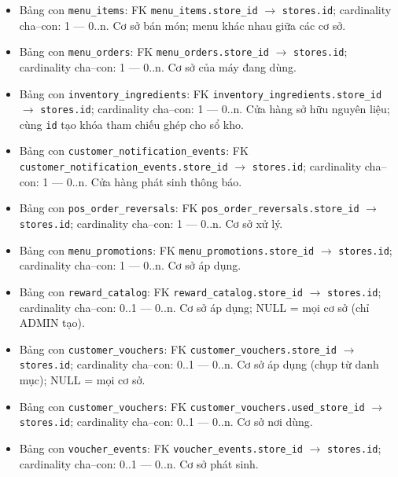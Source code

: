 \begin{itemize}
\item Bảng con \texttt{menu\_items}: FK \texttt{menu\_items.store\_id} $\rightarrow$ \texttt{stores.id}; cardinality cha--con: 1 — 0..n. Cơ sở bán món; menu khác nhau giữa các cơ sở.

\item Bảng con \texttt{menu\_orders}: FK \texttt{menu\_orders.store\_id} $\rightarrow$ \texttt{stores.id}; cardinality cha--con: 1 — 0..n. Cơ sở của máy đang dùng.

\item Bảng con \texttt{inventory\_ingredients}: FK \texttt{inventory\_ingredients.store\_id} $\rightarrow$ \texttt{stores.id}; cardinality cha--con: 1 — 0..n. Cửa hàng sở hữu nguyên liệu; cùng \texttt{id} tạo khóa tham chiếu ghép cho sổ kho.

\item Bảng con \texttt{customer\_notification\_events}: FK \texttt{customer\_notification\_events.store\_id} $\rightarrow$ \texttt{stores.id}; cardinality cha--con: 1 — 0..n. Cửa hàng phát sinh thông báo.

\item Bảng con \texttt{pos\_order\_reversals}: FK \texttt{pos\_order\_reversals.store\_id} $\rightarrow$ \texttt{stores.id}; cardinality cha--con: 1 — 0..n. Cơ sở xử lý.

\item Bảng con \texttt{menu\_promotions}: FK \texttt{menu\_promotions.store\_id} $\rightarrow$ \texttt{stores.id}; cardinality cha--con: 1 — 0..n. Cơ sở áp dụng.

\item Bảng con \texttt{reward\_catalog}: FK \texttt{reward\_catalog.store\_id} $\rightarrow$ \texttt{stores.id}; cardinality cha--con: 0..1 — 0..n. Cơ sở áp dụng; NULL = mọi cơ sở (chỉ ADMIN tạo).

\item Bảng con \texttt{customer\_vouchers}: FK \texttt{customer\_vouchers.store\_id} $\rightarrow$ \texttt{stores.id}; cardinality cha--con: 0..1 — 0..n. Cơ sở áp dụng (chụp từ danh mục); NULL = mọi cơ sở.

\item Bảng con \texttt{customer\_vouchers}: FK \texttt{customer\_vouchers.used\_store\_id} $\rightarrow$ \texttt{stores.id}; cardinality cha--con: 0..1 — 0..n. Cơ sở nơi dùng.

\item Bảng con \texttt{voucher\_events}: FK \texttt{voucher\_events.store\_id} $\rightarrow$ \texttt{stores.id}; cardinality cha--con: 0..1 — 0..n. Cơ sở phát sinh.


\end{itemize}
